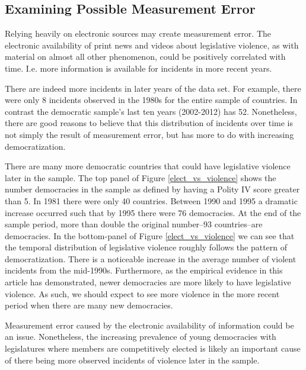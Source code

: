 \documentclass[a4paper]{article}\usepackage[]{graphicx}\usepackage[]{color}
\begin{document}
\subsection*{Examining Possible Measurement Error}

Relying heavily on electronic sources may create measurement error. The electronic availability of print news and videos about legislative violence, as with material on almost all other phenomenon, could be positively correlated with time. I.e. more information is available for incidents in more recent years.

There are indeed more incidents in later years of the data set. For example, there were only 8 incidents observed in the 1980s for the entire sample of countries. In contrast the democratic sample's last ten years (2002-2012) has 52. Nonetheless, there are good reasons to believe that this distribution of incidents over time is not simply the result of measurement error, but has more to do with increasing democratization.

There are many more democratic countries that could have legislative violence later in the sample. The top panel of Figure \ref{elect_vs_violence} shows the number democracies in the sample as defined by having a Polity IV score greater than 5. In 1981 there were only 40 countries. Between 1990 and 1995 a dramatic increase occurred such that by 1995 there were 76 democracies. At the end of the sample period, more than double the original number--93 countries--are democracies. In the bottom-panel of Figure \ref{elect_vs_violence} we can see that the temporal distribution of legislative violence roughly follows the pattern of democratization. There is a noticeable increase in the average number of violent incidents from the mid-1990s. Furthermore, as the empirical evidence in this article has demonstrated, newer democracies are more likely to have legislative violence. As such, we should expect to see more violence in the more recent period when there are many new democracies.

Measurement error caused by the electronic availability of information could be an issue. Nonetheless, the increasing prevalence of young democracies with legislatures where members are competitively elected is likely an important cause of there being more observed incidents of violence later in the sample.
\end{document}
